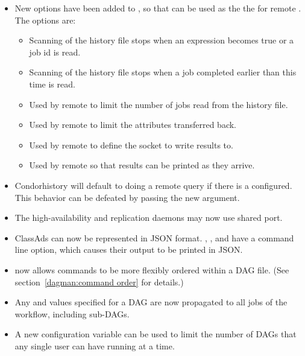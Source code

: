 \begin{itemize}
\item New options have been added to , so that  can be used as the
the  for remote . The options are:
  \begin{itemize}
  \item {} Scanning of the history file stops when an expression becomes true or a job id is read.
  \item {} Scanning of the history file stops when a job completed earlier than this time is read.
  \item {} Used by remote  to limit the number of jobs read from the history file.
  \item {} Used by remote  to limit the attributes transferred back.
  \item {} Used by remote  to define the socket to write results to.
  \item {} Used by remote  so that results can be printed as they arrive.
  \end{itemize}

\item Condor{history} will default to doing a remote query if there is a  configured. This behavior
can be defeated by passing the new  argument.

\item The high-availability and replication daemons may now use shared port.

\item ClassAds can now be represented in JSON format.
, , and  have a 
command line option, which causes their output to be printed in JSON.

\item {} now allows commands to be more flexibly ordered
within a DAG file.  (See section~\ref{dagman:command order} for details.)

\item Any  and
 values specified for a
DAG are now propagated to all jobs of the workflow, including sub-DAGs.

\item A new configuration variable 
can be used to limit the number of DAGs that any single user can have running at
a time.


\end{itemize}
